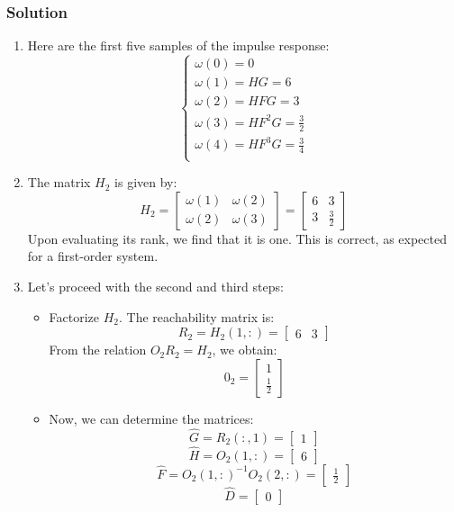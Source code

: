 \subsubsection*{Solution}
\begin{enumerate}
    \item Here are the first five samples of the impulse response:
        \[\begin{cases}
            \omega(0)=0 \\
            \omega(1)=HG=6 \\
            \omega(2)=HFG=3 \\
            \omega(3)=HF^2G=\frac{3}{2} \\
            \omega(4)=HF^3G=\frac{3}{4} \\
        \end{cases}\]
    \item The matrix $H_2$ is given by:
        \[H_2=\begin{bmatrix} \omega(1) & \omega(2) \\ \omega(2) & \omega(3) \end{bmatrix}=\begin{bmatrix} 6 & 3 \\ 3 & \frac{3}{2} \end{bmatrix}\]
        Upon evaluating its rank, we find that it is one. 
        This is correct, as expected for a first-order system. 
    \item Let's proceed with the second and third steps:
        \begin{itemize}
            \item Factorize $H_2$. 
                The reachability matrix is:
                \[R_2=H_2(1,:)=\begin{bmatrix} 6 & 3 \end{bmatrix}\]
                From the relation $O_2R_2=H_2$, we obtain: 
                \[0_2=\begin{bmatrix} 1 \\ \frac{1}{2} \end{bmatrix}\]
            \item Now, we can determine the matrices:
                \[\hat{G}=R_2(:,1)=\begin{bmatrix} 1 \end{bmatrix}\]
                \[\hat{H}=O_2(1,:)=\begin{bmatrix} 6 \end{bmatrix}\]
                \[\hat{F}=O_2(1,:)^{-1}O_2(2,:)=\begin{bmatrix} \frac{1}{2} \end{bmatrix}\]
                \[\hat{D}=\begin{bmatrix} 0 \end{bmatrix}\]
        \end{itemize}
\end{enumerate}